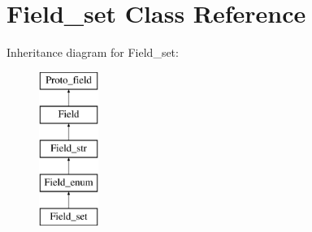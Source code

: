 \hypertarget{classField__set}{}\section{Field\+\_\+set Class Reference}
\label{classField__set}
Inheritance diagram for Field\+\_\+set\+:\begin{figure}[H]
\begin{center}
\leavevmode
\includegraphics[height=5.000000cm]{classField__set}
\end{center}
\end{figure}
